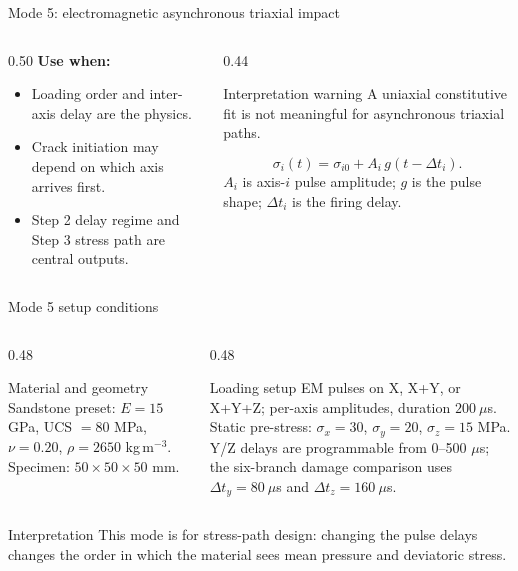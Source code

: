 \documentclass[11pt,aspectratio=169]{beamer}
\newcommand{\cncue}[1]{{\footnotesize\color{TUSTmidgray} #1}}
\begin{document}
\begin{frame}{Mode 5: electromagnetic asynchronous triaxial impact}
  \begin{columns}[T,onlytextwidth]
    \begin{column}{0.50\textwidth}
      \textbf{Use when:}
      \begin{itemize}
        \item Loading order and inter-axis delay are the physics.
        \item Crack initiation may depend on which axis arrives first.
        \item Step 2 delay regime and Step 3 stress path are central outputs.
      \end{itemize}
    \end{column}
    \begin{column}{0.44\textwidth}
      \begin{alertblock}{Interpretation warning}
        A uniaxial constitutive fit is not meaningful for asynchronous triaxial
        paths.
      \end{alertblock}
      \[
        \sigma_i(t)=\sigma_{i0}+A_i\,g(t-\Delta t_i).
      \]
      \cncue{$A_i$ is axis-$i$ pulse amplitude; $g$ is the pulse shape; $\Delta t_i$ is the firing delay.}
    \end{column}
  \end{columns}
\end{frame}

\begin{frame}{Mode 5 setup conditions}
  \small
  \begin{columns}[T,onlytextwidth]
    \begin{column}{0.48\textwidth}
      \begin{block}{Material and geometry}
        Sandstone preset: $E=15$ GPa, UCS $=80$ MPa, $\nu=0.20$,
        $\rho=2650$ kg\,m$^{-3}$.\\[3pt]
        Specimen: $50\times50\times50$ mm.
      \end{block}
    \end{column}
    \begin{column}{0.48\textwidth}
      \begin{exampleblock}{Loading setup}
        EM pulses on X, X+Y, or X+Y+Z; per-axis amplitudes, duration
        $200~\mu$s.\\[3pt]
        Static pre-stress: $\sigma_x=30$, $\sigma_y=20$,
        $\sigma_z=15$ MPa. Y/Z delays are programmable from 0--500 $\mu$s;
        the six-branch damage comparison uses $\Delta t_y=80~\mu$s and
        $\Delta t_z=160~\mu$s.
      \end{exampleblock}
    \end{column}
  \end{columns}
  \vspace{0.2cm}
  \begin{block}{Interpretation}
    This mode is for stress-path design: changing the pulse delays changes the
    order in which the material sees mean pressure and deviatoric stress.
  \end{block}
\end{frame}
\end{document}
